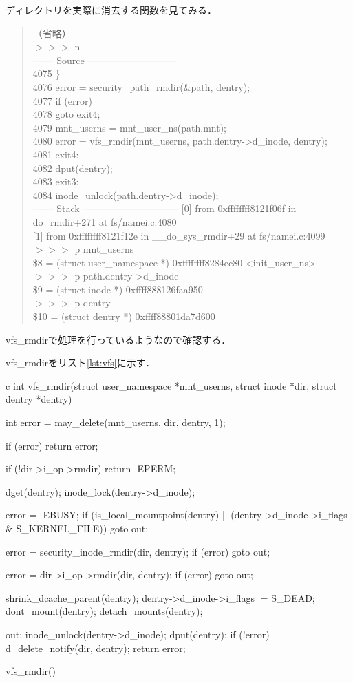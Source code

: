 ディレクトリを実際に消去する関数を見てみる．
\begin{quote}
（省略） \\
$>>>$ n \\
─── Source ─────────────
\\
 4075      \} \\
 4076      error = security\_path\_rmdir(\&path, dentry); \\
 4077      if (error) \\
 4078          goto exit4; \\
 4079      mnt\_userns = mnt\_user\_ns(path.mnt); \\
 4080      error = vfs\_rmdir(mnt\_userns, path.dentry->d\_inode, dentry); \\
 4081  exit4: \\
 4082      dput(dentry); \\
 4083  exit3: \\
 4084      inode\_unlock(path.dentry->d\_inode); \\
─── Stack ──────────────
{[0]} from 0xffffffff8121f06f in do\_rmdir+271 at fs/namei.c:4080 \\
{[1]} from 0xffffffff8121f12e in \_\_do\_sys\_rmdir+29 at fs/namei.c:4099 \\
$>>>$ p mnt\_userns \\
\$8 = (struct user\_namespace *) 0xffffffff8284ec80 <init\_user\_ns> \\
$>>>$ p path.dentry->d\_inode \\
\$9 = (struct inode *) 0xffff888126faa950 \\
$>>>$ p dentry \\
\$10 = (struct dentry *) 0xffff88801da7d600
\end{quote}

vfs\_rmdirで処理を行っているようなので確認する．

vfs\_rmdirをリスト\ref{lst:vfs}に示す．
\begin{longlisting}
\begin{myminted}{c}{}
int vfs_rmdir(struct user_namespace *mnt_userns, struct inode *dir,
         struct dentry *dentry)
{
	int error = may_delete(mnt_userns, dir, dentry, 1);

	if (error)
		return error;

	if (!dir->i_op->rmdir)
		return -EPERM;

	dget(dentry);
	inode_lock(dentry->d_inode);

	error = -EBUSY;
	if (is_local_mountpoint(dentry) ||
	    (dentry->d_inode->i_flags & S_KERNEL_FILE))
		goto out;

	error = security_inode_rmdir(dir, dentry);
	if (error)
		goto out;

	error = dir->i_op->rmdir(dir, dentry);
	if (error)
		goto out;

	shrink_dcache_parent(dentry);
	dentry->d_inode->i_flags |= S_DEAD;
	dont_mount(dentry);
	detach_mounts(dentry);

out:
	inode_unlock(dentry->d_inode);
	dput(dentry);
	if (!error)
		d_delete_notify(dir, dentry);
	return error;
}
\end{myminted}
\caption{vfs\_rmdir()}
\label{lst:vfs}
\end{longlisting}

